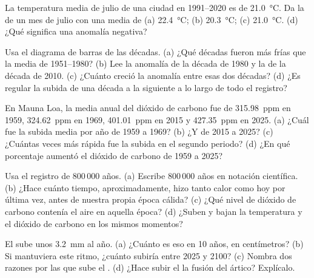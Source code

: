 \begin{exercise}[$\star$]\label{exo:g9:climate-past-and-present:4}
La temperatura media de julio de una ciudad en 1991--2020 es de
\qty{21.0}{\degreeCelsius}. Da la  de un mes de
julio con una media de (a) \qty{22.4}{\degreeCelsius};
(b) \qty{20.3}{\degreeCelsius}; (c) \qty{21.0}{\degreeCelsius}. (d) ¿Qué
significa una anomalía negativa?
\end{exercise}

\begin{exercise}[$\star\star$]\label{exo:g9:climate-past-and-present:5}
Usa el diagrama de barras de las décadas. (a) ¿Qué décadas fueron más frías
que la media de 1951--1980? (b) Lee la anomalía de la década de 1980 y la
de la década de 2010. (c) ¿Cuánto creció la anomalía entre esas dos
décadas? (d) ¿Es regular la subida de una década a la siguiente a lo largo
de todo el registro?
\end{exercise}

\begin{exercise}[$\star\star$]\label{exo:g9:climate-past-and-present:6}
En Mauna Loa, la media anual del dióxido de carbono fue de
\qty{315.98}{ppm} en 1959, \qty{324.62}{ppm} en 1969, \qty{401.01}{ppm} en
2015 y \qty{427.35}{ppm} en 2025. (a) ¿Cuál fue la subida media por año de
1959 a 1969? (b) ¿Y de 2015 a 2025? (c) ¿Cuántas veces más rápida fue la
subida en el segundo periodo? (d) ¿En qué porcentaje aumentó el dióxido de
carbono de 1959 a 2025?
\end{exercise}

\begin{exercise}[$\star\star$]\label{exo:g9:climate-past-and-present:7}
Usa el registro de 800\,000 años. (a) Escribe 800\,000 años en notación
científica. (b) ¿Hace cuánto tiempo, aproximadamente, hizo tanto calor
como hoy por última vez, antes de nuestra propia época cálida? (c) ¿Qué
nivel de dióxido de carbono contenía el aire en aquella época? (d) ¿Suben
y bajan la temperatura y el dióxido de carbono en los mismos momentos?
\end{exercise}

\begin{exercise}[$\star\star$]\label{exo:g9:climate-past-and-present:8}
El  sube unos \qty{3.2}{mm} al año. (a) ¿Cuánto es eso en 10 años, en
centímetros? (b) Si mantuviera este ritmo, ¿cuánto subiría entre 2025 y
2100? (c) Nombra dos razones por las que sube el . (d) ¿Hace subir el
 la fusión del  ártico? Explícalo.
\end{exercise}

